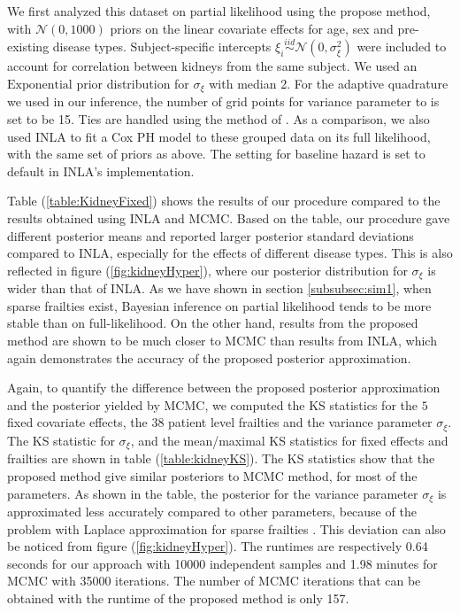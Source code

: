\documentclass[ba]{imsart}
\begin{document}
We first analyzed this dataset on partial likelihood using the propose method, with $\mathcal{N}(0, 1000)$ priors on the linear covariate effects for age, sex and pre-existing disease types. Subject-specific intercepts $\xi_{i}\overset{iid}{\sim}\mathcal{N}(0,\sigma^{2}_{\xi})$ were included to account for correlation between kidneys from the same subject. We used an $\text{Exponential}$ prior distribution for $\sigma_{\xi}$ with median 2. For the adaptive quadrature we used in our inference, the number of grid points for variance parameter to is set to be 15. Ties are handled using the method of \cite{Breslow}.
As a comparison, we also used INLA to fit a Cox PH model to these grouped data on its full likelihood, with the same set of priors as above. The setting for baseline hazard is set to default in INLA's implementation.

Table (\ref{table:KidneyFixed}) shows the results of our procedure compared to the results obtained using INLA and MCMC. Based on the table, our procedure gave different posterior means and reported larger posterior standard deviations compared to INLA, especially for the effects of different disease types. This is also reflected in figure (\ref{fig:kidneyHyper}), where our posterior distribution for $\sigma_{\xi}$ is wider than that of INLA. As we have shown in section \ref{subsubsec:sim1}, when sparse frailties exist, Bayesian inference on partial likelihood tends to be more stable than on full-likelihood. On the other hand, results from the proposed method are shown to be much closer to MCMC than results from INLA, which again demonstrates the accuracy of the proposed posterior approximation.

Again, to quantify the difference between the proposed posterior approximation and the posterior yielded by MCMC, we computed the KS statistics for the $5$ fixed covariate effects, the $38$ patient level frailties and the variance parameter $\sigma_\xi$. The KS statistic for $\sigma_\xi$, and the mean/maximal KS statistics for fixed effects and frailties are shown in table (\ref{table:kidneyKS}). The KS statistics show that the proposed method give similar posteriors to MCMC method, for most of the parameters. As shown in the table, the posterior for the variance parameter $\sigma_\xi$ is approximated less accurately compared to other parameters, because of the problem with Laplace approximation for sparse frailties \citep{Ogden2013ASR}. This deviation can also be noticed from figure (\ref{fig:kidneyHyper}). The runtimes are respectively 0.64 seconds for our approach with 10000 independent samples and 1.98 minutes for MCMC with 35000 iterations. The number of MCMC iterations that can be obtained with the runtime of the proposed method is only 157.
\end{document}
